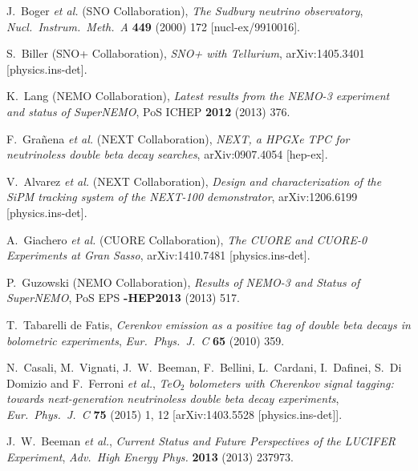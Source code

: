 \documentclass{PoS}
\begin{document}
\begin{thebibliography}{99}
   J.~Boger {\it et al.} (SNO Collaboration),
   \emph{The Sudbury neutrino observatory},
   \emph{Nucl.\ Instrum.\ Meth.\ A} {\bf 449} (2000) 172
   [nucl-ex/9910016].

   S.~Biller (SNO+ Collaboration),
   \emph{SNO+ with Tellurium},
   arXiv:1405.3401 [physics.ins-det].

   K.~Lang (NEMO Collaboration),
   \emph{Latest results from the NEMO-3 experiment and status of SuperNEMO},
   PoS ICHEP {\bf 2012} (2013) 376.


   F.~Gra\~nena {\it et al.} (NEXT Collaboration),
   \emph{NEXT, a HPGXe TPC for neutrinoless double beta decay searches},
   arXiv:0907.4054 [hep-ex].

  V.~Alvarez {\it et al.} (NEXT Collaboration),
   \emph{Design and characterization of the SiPM tracking system of the NEXT-100 demonstrator},
   arXiv:1206.6199 [physics.ins-det].

   A.~Giachero {\it et al.} (CUORE Collaboration),
   \emph{The CUORE and CUORE-0 Experiments at Gran Sasso},
   arXiv:1410.7481 [physics.ins-det].

   P.~Guzowski (NEMO Collaboration),
   \emph{Results of NEMO-3 and Status of SuperNEMO},
   PoS EPS {\bf -HEP2013} (2013) 517.

   T.~Tabarelli de Fatis,
   \emph{Cerenkov emission as a positive tag of double beta decays in bolometric experiments},
   \emph{Eur.\ Phys.\ J.\ C} {\bf 65} (2010) 359.

   N.~Casali, M.~Vignati, J.~W.~Beeman, F.~Bellini, L.~Cardani, I.~Dafinei, S.~Di Domizio and F.~Ferroni {\it et al.},
   \emph{TeO$_2$ bolometers with Cherenkov signal tagging: towards next-generation neutrinoless double beta decay experiments},
   \emph{Eur.\ Phys.\ J.\ C} {\bf 75} (2015) 1,  12
   [arXiv:1403.5528 [physics.ins-det]].

   J.~W.~Beeman {\it et al.},
   \emph{Current Status and Future Perspectives of the LUCIFER Experiment},
   \emph{Adv.\ High Energy Phys.} {\bf 2013} (2013) 237973.


\end{thebibliography}
\end{document}
